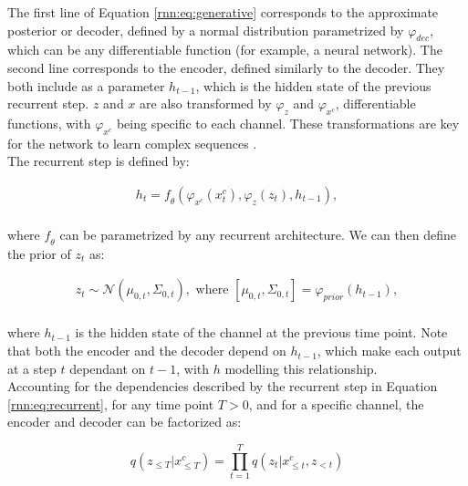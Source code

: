 The first line of Equation \ref{rnn:eq:generative} corresponds to the approximate posterior or decoder, defined by a normal distribution parametrized by $\varphi_{dec}$, which can be any differentiable function (for example, a neural network). The second line corresponds to the encoder, defined similarly to the decoder. They both include as a parameter $h_{t-1}$, which is the hidden state of the previous recurrent step. $z$ and $x$ are also transformed by $\varphi_{z}$ and $\varphi_{x^c}$, differentiable functions, with $\varphi_{x^c}$ being specific to each channel. These transformations are key for the network to learn complex sequences \cite{Chung2015}.\\

The recurrent step is defined by:

\begin{equation} 
\begin{aligned} \label{rnn:eq:recurrent}
h_{t} = \mathit{f}_{\theta}(\varphi_{x^c}(x^c_{t}), \varphi_{z}(z_t), h_{t-1}), \\
\end{aligned}
\end{equation}

where $\mathit{f}_{\theta}$ can be parametrized by any recurrent architecture. We can then define the prior of $z_t$ as:

\begin{equation}
\begin{gathered} \label{rnn:eq:prior} 
z_t \sim \mathcal{N}(\mu_{0,t},\Sigma_{0,t}), \text{ where } [\mu_{0,t},\Sigma_{0,t}] = \varphi_{prior} (h_{t-1}), \\
\end{gathered}
\end{equation}

where $h_{t-1}$ is the hidden state of the channel at the previous time point. Note that both the encoder and the decoder depend on $h_{t-1}$, which make each output at a step $t$ dependant on $t-1$, with $h$ modelling this relationship. \\

Accounting for the dependencies described by the recurrent step in Equation \ref{rnn:eq:recurrent}, for any time point $T>0$, and for a specific channel, the encoder and decoder can be factorized as:

\begin{equation} \label{eq:decfact}
\mathit{q}(z_{\leq T} | x^c_{\leq T}) = \prod^T_{t=1} \mathit{q}(z_t | x^c_{\leq t}, z_{<t})
\end{equation}

